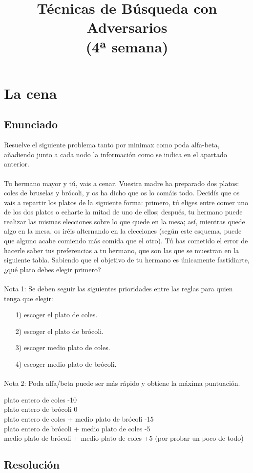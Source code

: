 \documentclass[a4paper,10pt]{article}
\title{Técnicas de Búsqueda con Adversarios\\(4ª semana)}
\author{}
\begin{document}
\maketitle
\pagebreak
\tableofcontents
\pagebreak

\section{La cena}
\subsection{Enunciado}
Resuelve el siguiente problema tanto por minimax como poda alfa-beta, añadiendo junto a cada nodo la información como se indica en el apartado anterior.
\paragraph{}
Tu hermano mayor y tú, vais a cenar. Vuestra madre ha preparado dos platos: coles de bruselas y brócoli, y os ha dicho que os lo comáis todo. Decidís que os vais a repartir los platos de la siguiente forma: primero, tú eliges entre comer uno de los dos platos o echarte la mitad de uno de ellos; después, tu hermano puede realizar las mismas elecciones sobre lo que quede en la mesa; así, mientras quede algo en la mesa, os iréis alternando en la elecciones (según este esquema, puede que alguno acabe comiendo más comida que el otro). Tú has cometido el error de hacerle saber tus preferencias a tu hermano, que son las que se muestran en la siguiente tabla. Sabiendo que el objetivo de tu hermano es únicamente fastidiarte, ¿qué plato debes elegir primero?
\paragraph{}
Nota 1: Se deben seguir las siguientes prioridades entre las reglas para quien tenga que elegir: 
\begin{itemize}
    \item [1)]escoger el plato de coles.
    \item [2)]escoger el plato de brócoli.
    \item [3)]escoger medio plato de coles.
    \item [4)]escoger medio plato de brócoli.
\end{itemize}
\paragraph{}
Nota 2: Poda alfa/beta puede ser más rápido y obtiene la máxima puntuación.

plato entero de coles 	-10\\
plato entero de brócoli 	0\\
plato entero de coles + medio plato de brócoli 	-15\\
plato entero de brócoli + medio plato de coles 	-5\\
medio plato de brócoli + medio plato de coles 	+5 (por probar un poco de todo)

\subsection{Resolución}
\end{document}
